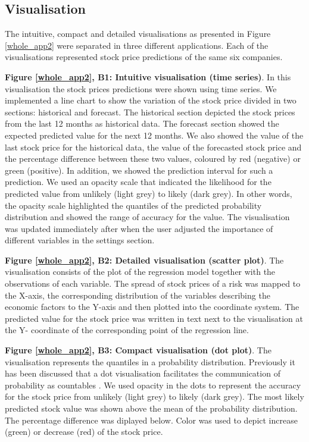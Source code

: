 \documentclass[final,5p,times,twocolumn,authoryear]{elsarticle}
\begin{document}
\subsection{Visualisation}
The intuitive, compact and detailed visualisations as presented in Figure \ref{whole_app2} were separated in three different applications. Each of the visualisations represented stock price predictions of the same six companies.

\textbf{Figure \ref{whole_app2}, B1:  Intuitive visualisation (time series)}. In this visualisation the stock prices predictions were shown using time series. We implemented a line chart to show the variation of the stock price divided in two sections: historical and forecast. The historical section depicted the stock prices from the last 12 months as historical data. The forecast section showed the expected predicted value for the next 12 months. We also showed the value of the last stock price for the historical data, the value of the forecasted stock price and the percentage difference between these two values, coloured by red (negative) or green (positive). In addition, we showed the prediction interval for such a prediction. We used an opacity scale that indicated the likelihood for the predicted value from unlikely (light grey) to likely (dark grey). In other words, the opacity scale highlighted the quantiles of the predicted probability distribution and showed the range of accuracy for the value. The visualisation was updated immediately after when the user adjusted the importance of different variables in the settings section.

\textbf{Figure \ref{whole_app2}, B2: Detailed visualisation (scatter plot)}. The visualisation consists of the plot of the regression model together with the observations of each variable. The spread of stock prices of a risk was mapped to the X-axis, the corresponding distribution of the variables describing the economic factors to the Y-axis and then plotted into the coordinate system. The predicted value for the stock price was written in text next to the visualisation at the Y- coordinate of the corresponding point of the regression line.


\textbf{Figure \ref{whole_app2}, B3: Compact visualisation (dot plot)}. The visualisation represents the quantiles in a probability distribution. Previously it has been discussed that a dot visualisation facilitates the communication of probability as countables \citep{Garcia-retamero2016}. We used opacity in the dots to represent the accuracy for the stock price from unlikely (light grey) to likely (dark grey). The most likely predicted stock value was shown above the mean of the probability distribution. The percentage difference was diplayed below. Color was used to depict increase (green) or decrease (red) of the stock price.
\end{document}
